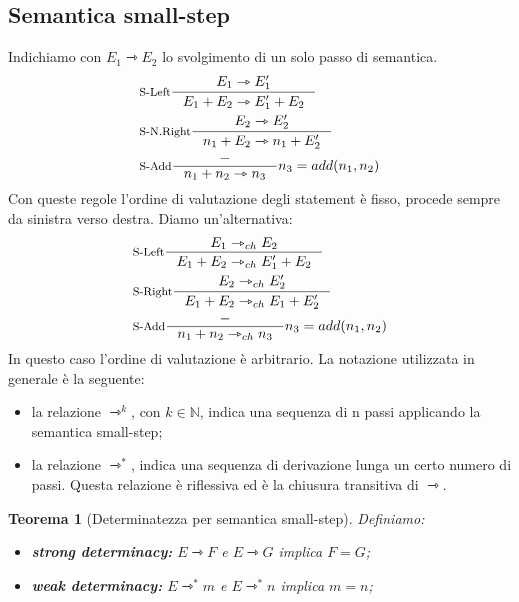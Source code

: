 \documentclass[a4paper, 11pt]{article}
\newtheorem{thm}{Teorema}[section]
\begin{document}
	\subsection{Semantica small-step}
	Indichiamo con $E_1 \rightarrowtriangle E_2$ lo svolgimento di un solo passo di semantica.
	\begin{align*} 
	&\inference[S-Left]{E_1 \rightarrowtriangle E_1'}{E_1 + E_2 \rightarrowtriangle E_1' + E_2} \\
	&\inference[S-N.Right]{E_2 \rightarrowtriangle E_2'}{n_1 + E_2 \rightarrowtriangle n_1 + E_2'} \\
	&\inference[S-Add]{-}{n_1 + n_2 \rightarrowtriangle n_3} n_3 = add(n_1, n_2)
	\end{align*}
	Con queste regole l'ordine di valutazione degli statement è fisso, procede sempre da sinistra verso destra.
	Diamo un'alternativa:
	\begin{align*}
		&\inference[S-Left]{E_1 \rightarrowtriangle_{ch} E_2}{E_1 + E_2 \rightarrowtriangle_{ch} E_1' + E_2} \\
		&\inference[S-Right]{E_2 \rightarrowtriangle_{ch} E_2'}{E_1 + E_2 \rightarrowtriangle_{ch} E_1 + E_2'} \\
		&\inference[S-Add]{-}{n_1 + n_2 \rightarrowtriangle_{ch} n_3} n_3 = add(n_1, n_2)
	\end{align*}
	In questo caso l'ordine di valutazione è arbitrario.
	La notazione utilizzata in generale è la seguente:
	\begin{itemize}
		\item la relazione $\rightarrowtriangle^k$, con $k \in \mathbb{N}$, indica una sequenza di n passi applicando la semantica small-step;
		\item la relazione $\rightarrowtriangle^\ast$, indica una sequenza di derivazione lunga un certo numero di passi. Questa relazione è riflessiva ed è la chiusura transitiva di $\rightarrowtriangle$.
	\end{itemize}
	
	\begin{thm}[Determinatezza per semantica small-step] Definiamo:
		\begin{itemize}
			\item \textbf{strong determinacy:} $E \rightarrowtriangle F$ e $E \rightarrowtriangle G$ implica $F=G$;
			\item \textbf{weak determinacy:} $E \rightarrowtriangle^\ast m$ e $E \rightarrowtriangle^\ast n$ implica $m=n$;
		\end{itemize}
	\end{thm}
\end{document}
